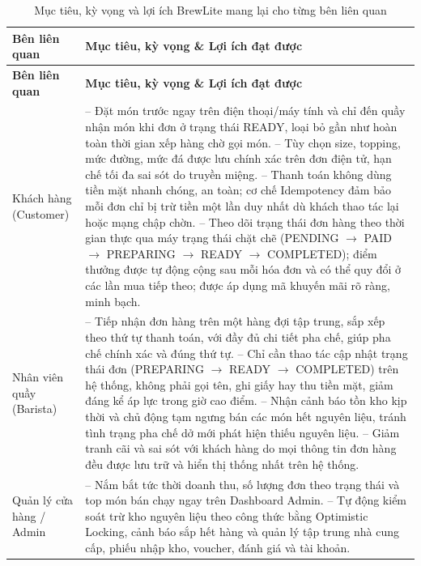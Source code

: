 \documentclass[12pt,a4paper]{report}
\begin{document}
\begin{longtable}{>{\raggedright\arraybackslash}p{3.4cm}>{\raggedright\arraybackslash}p{11.8cm}}
\caption{Mục tiêu, kỳ vọng và lợi ích BrewLite mang lại cho từng bên liên quan}\\
\hline
\rowcolor{gray!20} \textbf{Bên liên quan} & \textbf{Mục tiêu, kỳ vọng \& Lợi ích đạt được} \\
\hline
\endfirsthead
\hline
\rowcolor{gray!20} \textbf{Bên liên quan} & \textbf{Mục tiêu, kỳ vọng \& Lợi ích đạt được} \\
\hline
\endhead
Khách hàng (Customer) 
& -- Đặt món trước ngay trên điện thoại/máy tính và chỉ đến quầy nhận món khi đơn ở trạng thái READY, loại bỏ gần như hoàn toàn thời gian xếp hàng chờ gọi món. \newline
-- Tùy chọn size, topping, mức đường, mức đá được lưu chính xác trên đơn điện tử, hạn chế tối đa sai sót do truyền miệng. \newline
-- Thanh toán không dùng tiền mặt nhanh chóng, an toàn; cơ chế Idempotency đảm bảo mỗi đơn chỉ bị trừ tiền một lần duy nhất dù khách thao tác lại hoặc mạng chập chờn. \newline
-- Theo dõi trạng thái đơn hàng theo thời gian thực qua máy trạng thái chặt chẽ (PENDING $\rightarrow$ PAID $\rightarrow$ PREPARING $\rightarrow$ READY $\rightarrow$ COMPLETED); điểm thưởng được tự động cộng sau mỗi hóa đơn và có thể quy đổi ở các lần mua tiếp theo; được áp dụng mã khuyến mãi rõ ràng, minh bạch. \\
\hline
Nhân viên quầy (Barista) 
& -- Tiếp nhận đơn hàng trên một hàng đợi tập trung, sắp xếp theo thứ tự thanh toán, với đầy đủ chi tiết pha chế, giúp pha chế chính xác và đúng thứ tự. \newline
-- Chỉ cần thao tác cập nhật trạng thái đơn (PREPARING $\rightarrow$ READY $\rightarrow$ COMPLETED) trên hệ thống, không phải gọi tên, ghi giấy hay thu tiền mặt, giảm đáng kể áp lực trong giờ cao điểm. \newline
-- Nhận cảnh báo tồn kho kịp thời và chủ động tạm ngưng bán các món hết nguyên liệu, tránh tình trạng pha chế dở mới phát hiện thiếu nguyên liệu. \newline
-- Giảm tranh cãi và sai sót với khách hàng do mọi thông tin đơn hàng đều được lưu trữ và hiển thị thống nhất trên hệ thống. \\
\hline
Quản lý cửa hàng / Admin
& -- Nắm bắt tức thời doanh thu, số lượng đơn theo trạng thái và top món bán chạy ngay trên Dashboard Admin. \newline
-- Tự động kiểm soát trừ kho nguyên liệu theo công thức bằng Optimistic Locking, cảnh báo sắp hết hàng và quản lý tập trung nhà cung cấp, phiếu nhập kho, voucher, đánh giá và tài khoản. \\

\end{longtable}
\end{document}
